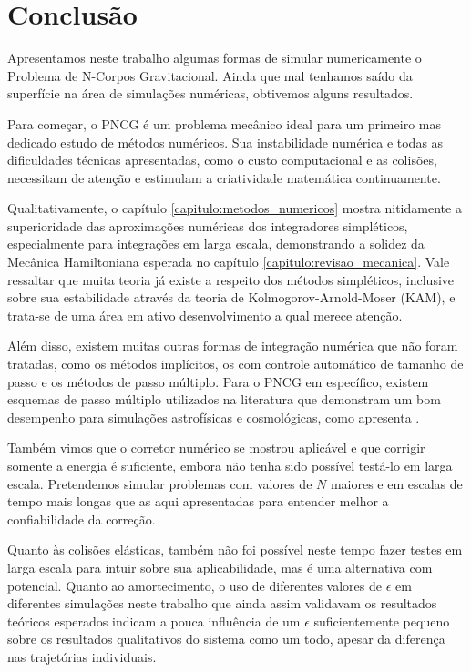 \chapter{Conclusão}

Apresentamos neste trabalho algumas formas de simular numericamente o Problema de N-Corpos Gravitacional. Ainda que mal tenhamos saído da superfície na área de simulações numéricas, obtivemos alguns resultados.

Para começar, o PNCG é um problema mecânico ideal para um primeiro mas dedicado estudo de métodos numéricos. Sua instabilidade numérica e todas as dificuldades técnicas apresentadas, como o custo computacional e as colisões, necessitam de atenção e estimulam a criatividade matemática continuamente.

Qualitativamente, o capítulo \ref{capitulo:metodos_numericos} mostra nitidamente a superioridade das aproximações numéricas dos integradores simpléticos, especialmente para integrações em larga escala, demonstrando a solidez da Mecânica Hamiltoniana esperada no capítulo \ref{capitulo:revisao_mecanica}. Vale ressaltar que muita teoria já existe a respeito dos métodos simpléticos, inclusive sobre sua estabilidade através da teoria de Kolmogorov-Arnold-Moser (KAM), e trata-se de uma área em ativo desenvolvimento a qual merece atenção.

Além disso, existem muitas outras formas de integração numérica que não foram tratadas, como os métodos implícitos, os com controle automático de tamanho de passo e os métodos de passo múltiplo. Para o PNCG em específico, existem esquemas de passo múltiplo utilizados na literatura que demonstram um bom desempenho para simulações astrofísicas e cosmológicas, como apresenta \cite{aarseth_gravitational_2003}.

Também vimos que o corretor numérico se mostrou aplicável e que corrigir somente a energia é suficiente, embora não tenha sido possível testá-lo em larga escala. Pretendemos simular problemas com valores de $N$ maiores e em escalas de tempo mais longas que as aqui apresentadas para entender melhor a confiabilidade da correção.

Quanto às colisões elásticas, também não foi possível neste tempo fazer testes em larga escala para intuir sobre sua aplicabilidade, mas é uma alternativa com potencial. Quanto ao amortecimento, o uso de diferentes valores de $\epsilon$ em diferentes simulações neste trabalho que ainda assim validavam os resultados teóricos esperados indicam a pouca influência de um $\epsilon$ suficientemente pequeno sobre os resultados qualitativos do sistema como um todo, apesar da diferença nas trajetórias individuais.

